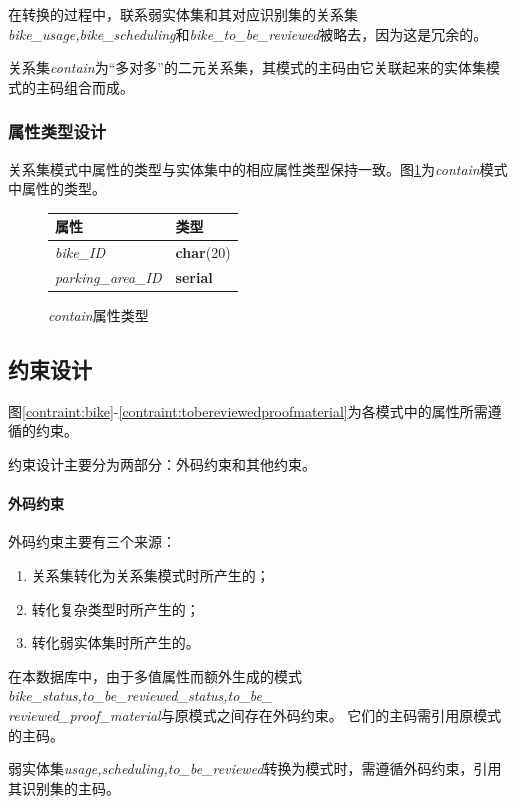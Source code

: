     在转换的过程中，联系弱实体集和其对应识别集的关系集\textit{bike\_usage,bike\_scheduling}和\textit{bike\_to\_be\_reviewed}被略去，因为这是冗余的\cite{dbconcept2}。

    关系集\textit{contain}为“多对多”的二元关系集，其模式的主码由它关联起来的实体集模式的主码组合而成。

\subsubsection{属性类型设计}
  关系集模式中属性的类型与实体集中的相应属性类型保持一致。图\ref{tab:contain}为\textit{contain}模式中属性的类型。
  \begin{figure}[!htp]
      \centering
      \caption{\textit{contain}属性类型}
      \label{tab:contain}
      \begin{tabular}{ll}\toprule
        属性&类型\\\midrule
       \textit{bike\_ID}&\textbf{char}(20)\\
       \textit{parking\_area\_ID}&\textbf{serial}\\
       \bottomrule
      \end{tabular}
\end{figure}
\subsection{约束设计}
图\ref{contraint:bike}-\ref{contraint:tobereviewedproofmaterial}为各模式中的属性所需遵循的约束。

约束设计主要分为两部分：外码约束和其他约束。

\paragraph{外码约束}
外码约束主要有三个来源：

\begin{enumerate}
    \item 关系集转化为关系集模式时所产生的；
    \item 转化复杂类型时所产生的；
    \item 转化弱实体集时所产生的。
\end{enumerate}

在本数据库中，由于多值属性而额外生成的模式\textit{bike\_status,to\_be\_reviewed\_status,to\_be\_}\\\textit{reviewed\_proof\_material}与原模式之间存在外码约束。
它们的主码需引用原模式的主码。

弱实体集\textit{usage,scheduling,to\_be\_reviewed}转换为模式时，需遵循外码约束，引用其识别集的主码。

